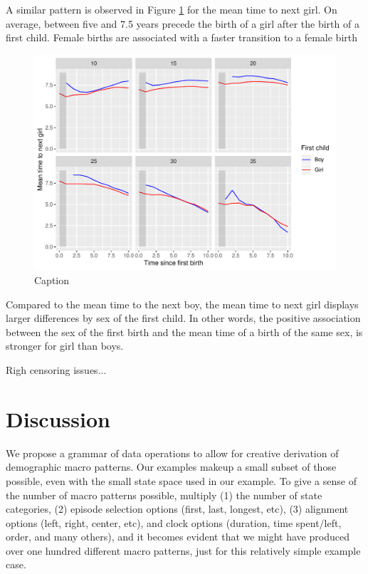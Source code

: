 \documentclass{article}
\begin{document}
A similar pattern is observed in Figure \ref{fert_03} for the mean time to next girl. On average, between five and 7.5 years precede the birth of a girl after the birth of a first child. Female births are associated with a faster transition to a female birth

\begin{figure}[H]
    \centering
    \includegraphics{Spells/Figures/mt_second_gir_by_sex_first.pdf}
    \caption{Caption}
    \label{fert_03}
\end{figure}

Compared to the mean time to the next boy, the mean time to next girl displays larger differences by sex of the first child. In other words, the positive association between the sex of the first birth and the mean time of a birth of the same sex, is stronger for girl than boys.

Righ censoring issues...

\section{Discussion}

We propose a grammar of data operations to allow for creative derivation of demographic macro patterns. Our examples makeup a small subset of those possible, even with the small state space used in our example. To give a sense of the number of macro patterns possible, multiply (1) the number of state categories, (2) episode selection options (first, last, longest, etc), (3) alignment options (left, right, center, etc), and clock options (duration, time spent/left, order, and many others), and it becomes evident that we might have produced over one hundred different macro patterns, just for this relatively simple example case. 
\end{document}
